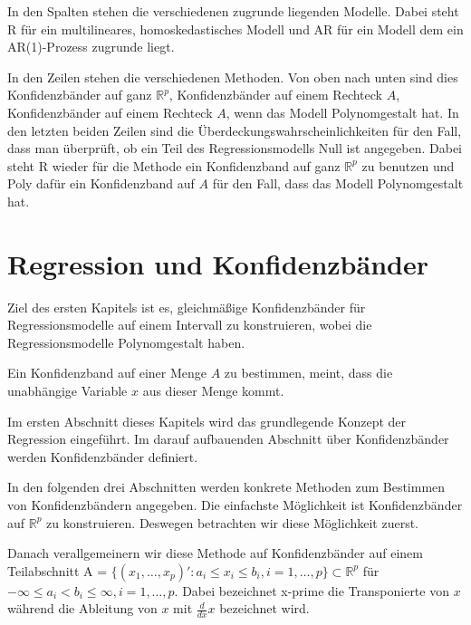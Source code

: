 \documentclass[12pt,a4paper]{article}
\theoremstyle{definition}
\theoremstyle{definition}
\theoremstyle{definition}
\theoremstyle{definition}
\begin{document}
In den Spalten stehen die verschiedenen zugrunde liegenden Modelle. Dabei steht R für ein multilineares, homoskedastisches Modell und AR für ein Modell dem ein AR(1)-Prozess zugrunde liegt.

In den Zeilen stehen die verschiedenen Methoden. Von oben nach unten sind dies Konfidenzbänder auf ganz $\mathbb{R}^p$, Konfidenzbänder auf einem Rechteck $A$, Konfidenzbänder auf einem Rechteck $A$, wenn das Modell Polynomgestalt hat. In den letzten beiden Zeilen sind die Überdeckungswahrscheinlichkeiten für den Fall, dass man überprüft, ob ein Teil des Regressionsmodells Null ist angegeben. Dabei steht R wieder für die Methode ein Konfidenzband auf ganz $\mathbb{R}^p$ zu benutzen und Poly dafür ein Konfidenzband auf $A$ für den Fall, dass das Modell Polynomgestalt hat.


\newpage
\printglossary[title=Variablenverzeichnis]



\newpage
\section{Regression und Konfidenzbänder}
\label{Regression und Konfidenzbaender}
Ziel des ersten Kapitels ist es, gleichmäßige Konfidenzbänder für Regressionsmodelle auf einem Intervall zu konstruieren, wobei die Regressionsmodelle Polynomgestalt haben. 

Ein Konfidenzband auf einer Menge $A$ zu bestimmen, meint, dass die unabhängige Variable $x$ aus dieser Menge kommt.

Im ersten Abschnitt dieses Kapitels wird das grundlegende Konzept der Regression eingeführt. Im darauf aufbauenden Abschnitt über Konfidenzbänder werden Konfidenzbänder definiert. 

In den folgenden drei Abschnitten werden konkrete Methoden zum Bestimmen von Konfidenzbändern angegeben. 
Die einfachste Möglichkeit ist Konfidenzbänder auf $\mathbb{R}^p$ zu konstruieren. Deswegen betrachten wir diese Möglichkeit zuerst.

Danach verallgemeinern wir diese Methode auf Konfidenzbänder auf einem Teilabschnitt \gls{A} = $\{(x_1, \ldots, x_p)' : a_i \leq x_i \leq b_i, i = 1, \ldots, p \} \subset \mathbb{R}^p$ für $- \infty \leq a_i < b_i \leq \infty, i=1, \ldots, p$. Dabei bezeichnet \gls{x-prime} die Transponierte von $x$ während die Ableitung von $x$ mit $\frac{d}{dx}x$ bezeichnet wird. 
\end{document}
